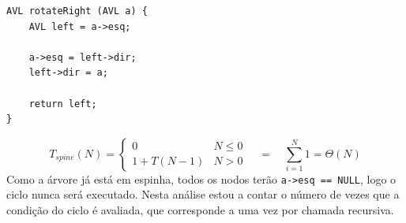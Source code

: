 \documentclass[a4paper,11pt]{article}
\begin{document}
\begin{verbatim}
AVL rotateRight (AVL a) {
	AVL left = a->esq;
	
	a->esq = left->dir;
	left->dir = a;
	
	return left;
}
\end{verbatim}
\[
	T_{spine}(N) =
	\begin{cases}
		0 & N \leq 0 \\
		1 + T(N - 1) & N > 0
	\end{cases}
	\quad = \quad \sum_{i=1}^{N} 1 = \Theta(N)
\]
Como a árvore já está em espinha, todos os nodos terão \texttt{a->esq == NULL}, logo o ciclo nunca será executado. Nesta análise estou a contar o número de vezes que a condição do ciclo é avaliada, que corresponde a uma vez por chamada recursiva.
\end{document}
